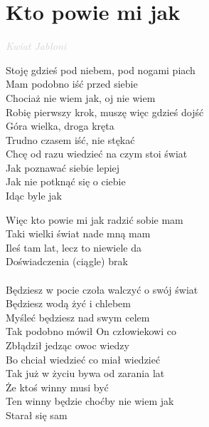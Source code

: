 \documentclass[a5paper, 10pt]{book}
\begin{document}
\section{Kto powie mi jak}\textcolor{lightgray}{\textit{Kwiat Jabłoni}}\vspace*{2mm}\\
\begin{minipage}[t]{0.8\textwidth}
  Stoję gdzieś pod niebem, pod nogami piach\\
  Mam podobno iść przed siebie\\
  Chociaż nie wiem jak, oj nie wiem\\
  Robię pierwszy krok, muszę więc gdzieś dojść\\
  Góra wielka, droga kręta\\
  Trudno czasem iść, nie stękać\\
  Chcę od razu wiedzieć na czym stoi świat\\
  Jak poznawać siebie lepiej\\
  Jak nie potknąć się o ciebie\\
  Idąc byle jak\vspace*{1.9mm}

  \hspace*{5mm}Więc kto powie mi jak radzić sobie mam \\
  \hspace*{5mm}Taki wielki świat nade mną mam \\
  \hspace*{5mm}Ileś tam lat, lecz to niewiele da\\
  \hspace*{5mm}Doświadczenia (ciągle) brak\\
  \\
  Będziesz w pocie czoła walczyć o swój świat\\
  Będziesz wodą żyć i chlebem\\
  Myśleć będziesz nad swym celem\\
  Tak podobno mówił On człowiekowi co\\
  Zbłądził jedząc owoc wiedzy\\
  Bo chciał wiedzieć co miał wiedzieć\\
  Tak już w życiu bywa od zarania lat\\
  Że ktoś winny musi być\\
  Ten winny będzie choćby nie wiem jak\\
  Starał się sam\\
\end{minipage}
\end{document}
